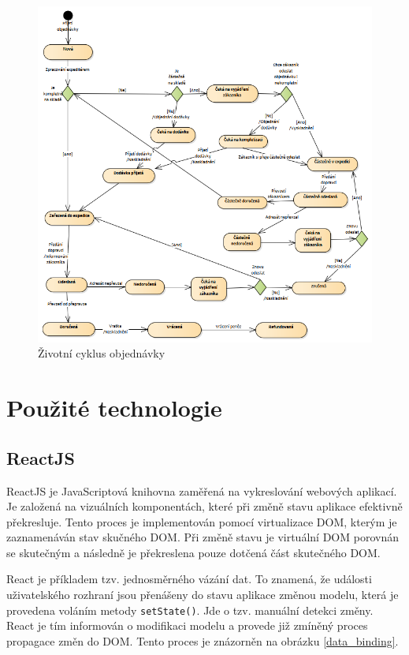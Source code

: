 \documentclass[thesis=B,czech]{FITthesis}[2012/06/26]
\begin{document}
\begin{figure}
	\includegraphics[width=\textwidth]{order_cycle.png}
	\caption{Životní cyklus objednávky}\label{oredr_cycle}
\end{figure}


\section{Použité technologie}

\subsection{ReactJS}
	ReactJS\cite{reactjs} je JavaScriptová knihovna zaměřená na vykreslování webových aplikací. Je založená na vizuálních komponentách, které při změně stavu aplikace efektivně překresluje. Tento proces je implementován pomocí virtualizace DOM, kterým je zaznamenáván stav skučného DOM. Při změně stavu je virtuální DOM porovnán se skutečným a následně je překreslena pouze dotčená část skutečného DOM. \cite{react-crud-app}

	React je příkladem tzv. jednosměrného vázání dat. To znamená, že události uživatelského rozhraní jsou přenášeny do stavu aplikace   změnou modelu, která je provedena voláním metody \verb|setState()|. Jde o tzv. manuální detekci změny. React je tím informován o modifikaci modelu a provede již zmíněný proces propagace změn do DOM.\cite{data_binding} Tento proces je znázorněn na obrázku \ref{data_binding}.
\end{document}
